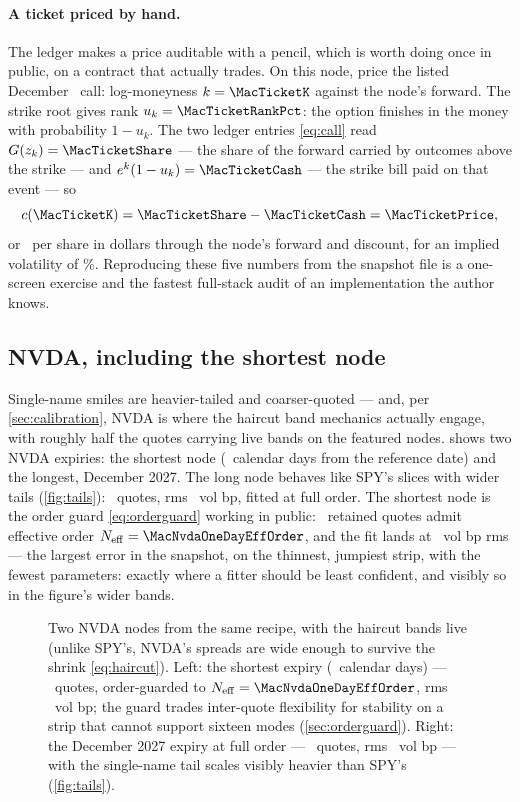 \paragraph{A ticket priced by hand.}
The ledger makes a price auditable with a pencil, which is worth doing
once in public, on a contract that actually trades.  On this node,
price the listed December \MacTicketStrike\ call: log-moneyness
$k=\MacTicketK$ against the node's forward.  The strike root gives rank
$u_k=\MacTicketRankPct$: the option finishes in the money with
probability $1-u_k$.  The two ledger entries \eqref{eq:call} read
$G(z_k)=\MacTicketShare$ --- the share of the forward carried by
outcomes above the strike --- and
$e^{k}(1-u_k)=\MacTicketCash$ --- the strike bill paid on that event ---
so
\[
c(\MacTicketK)=\MacTicketShare-\MacTicketCash=\MacTicketPrice,
\]
or \MacTicketDollarPrice\ per share in dollars through the node's
forward and discount, for an implied volatility of \MacTicketIvPct\%.
Reproducing these five numbers from the snapshot file is a one-screen
exercise and the fastest full-stack audit of an implementation the
author knows.

\subsection{NVDA, including the shortest node}

Single-name smiles are heavier-tailed and coarser-quoted --- and, per
\cref{sec:calibration}, NVDA is where the haircut band mechanics
actually engage, with roughly half the quotes carrying live bands on
the featured nodes.   shows two NVDA expiries: the
shortest node (\MacNvdaOneDayDays\ calendar days from the reference
date) and the longest, December 2027.
The long node behaves like SPY's slices with wider tails
(\cref{fig:tails}): \MacNvdaLongNQuotes\ quotes, rms
\MacNvdaLongRmsBp\ vol bp, fitted at full order.  The shortest node is
the order guard \eqref{eq:orderguard} working in public:
\MacNvdaOneDayNQuotes\ retained quotes admit effective order
$N_{\mathrm{eff}}=\MacNvdaOneDayEffOrder$, and the fit lands at
\MacNvdaOneDayRmsBp\ vol bp rms --- the largest error in the snapshot,
on the thinnest, jumpiest strip, with the fewest parameters: exactly
where a fitter should be least confident, and visibly so in the
figure's wider bands.

\begin{figure}[htbp]
\centering
{}
\caption{Two NVDA nodes from the same recipe, with the haircut bands
live (unlike SPY's, NVDA's spreads are wide enough to survive the
shrink \eqref{eq:haircut}).  Left: the shortest expiry
(\MacNvdaOneDayDays\ calendar days) --- \MacNvdaOneDayNQuotes\ quotes,
order-guarded to $N_{\mathrm{eff}}=\MacNvdaOneDayEffOrder$, rms
\MacNvdaOneDayRmsBp\ vol bp; the guard trades inter-quote flexibility
for stability on a strip that cannot support sixteen modes
(\cref{sec:orderguard}).  Right: the December 2027 expiry at full order
--- \MacNvdaLongNQuotes\ quotes, rms \MacNvdaLongRmsBp\ vol bp --- with
the single-name tail scales visibly heavier than SPY's
(\cref{fig:tails}).}
\label{fig:nvda_nodes}
\end{figure}

